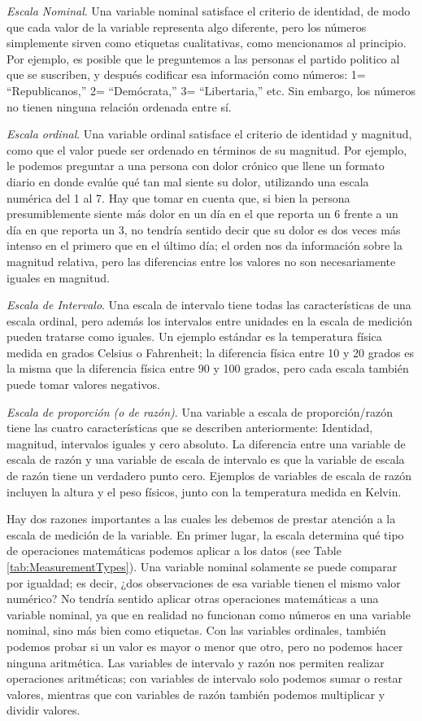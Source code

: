 \documentclass[
  12pt,
]{book}
\theoremstyle{definition}
\theoremstyle{definition}
\theoremstyle{definition}
\theoremstyle{remark}
\begin{document}
\emph{Escala Nominal}. Una variable nominal satisface el criterio de identidad, de modo que cada valor de la variable representa algo diferente, pero los números simplemente sirven como etiquetas cualitativas, como mencionamos al principio. Por ejemplo, es posible que le preguntemos a las personas el partido politico al que se suscriben, y después codificar esa información como números: 1= ``Republicanos,'' 2= ``Demócrata,'' 3= ``Libertaria,'' etc. Sin embargo, los números no tienen ninguna relación ordenada entre sí.

\emph{Escala ordinal}. Una variable ordinal satisface el criterio de identidad y magnitud, como que el valor puede ser ordenado en términos de su magnitud. Por ejemplo, le podemos preguntar a una persona con dolor crónico que llene un formato diario en donde evalúe qué tan mal siente su dolor, utilizando una escala numérica del 1 al 7. Hay que tomar en cuenta que, si bien la persona presumiblemente siente más dolor en un día en el que reporta un 6 frente a un día en que reporta un 3, no tendría sentido decir que su dolor es dos veces más intenso en el primero que en el último día; el orden nos da información sobre la magnitud relativa, pero las diferencias entre los valores no son necesariamente iguales en magnitud.

\emph{Escala de Intervalo}. Una escala de intervalo tiene todas las características de una escala ordinal, pero además los intervalos entre unidades en la escala de medición pueden tratarse como iguales. Un ejemplo estándar es la temperatura física medida en grados Celsius o Fahrenheit; la diferencia física entre 10 y 20 grados es la misma que la diferencia física entre 90 y 100 grados, pero cada escala también puede tomar valores negativos.

\emph{Escala de proporción (o de razón)}. Una variable a escala de proporción/razón tiene las cuatro características que se describen anteriormente: Identidad, magnitud, intervalos iguales y cero absoluto. La diferencia entre una variable de escala de razón y una variable de escala de intervalo es que la variable de escala de razón tiene un verdadero punto cero. Ejemplos de variables de escala de razón incluyen la altura y el peso físicos, junto con la temperatura medida en Kelvin.

Hay dos razones importantes a las cuales les debemos de prestar atención a la escala de medición de la variable. En primer lugar, la escala determina qué tipo de operaciones matemáticas podemos aplicar a los datos (see Table \ref{tab:MeasurementTypes}). Una variable nominal solamente se puede comparar por igualdad; es decir, ¿dos observaciones de esa variable tienen el mismo valor numérico? No tendría sentido aplicar otras operaciones matemáticas a una variable nominal, ya que en realidad no funcionan como números en una variable nominal, sino más bien como etiquetas. Con las variables ordinales, también podemos probar si un valor es mayor o menor que otro, pero no podemos hacer ninguna aritmética. Las variables de intervalo y razón nos permiten realizar operaciones aritméticas; con variables de intervalo solo podemos sumar o restar valores, mientras que con variables de razón también podemos multiplicar y dividir valores.
\end{document}
